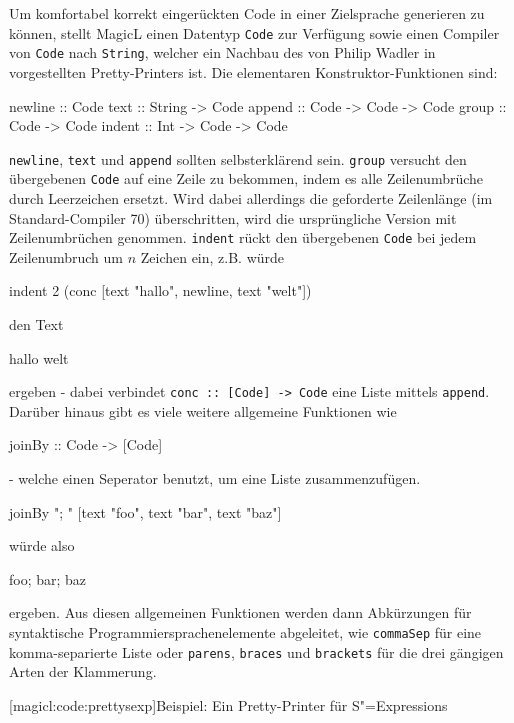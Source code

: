 \documentclass[11pt, a4paper, bibgerm]{book}
\newcommand\icode[1]{\lstinline?#1?}
\newcommand\lsubsection{}
\newcommand{\sexps}{S"=Expressions}
\begin{document}
Um komfortabel korrekt eingerückten Code in einer Zielsprache generieren
zu können, stellt MagicL einen Datentyp \icode{Code} zur Verfügung sowie
einen Compiler von \icode{Code} nach \icode{String}, welcher ein Nachbau
des von Philip Wadler in \cite[S.223ff]{FunOfProgramming} vorgestellten
Pretty-Printers ist. Die elementaren Konstruktor-Funktionen sind:
\begin{code}
newline :: Code
text    :: String -> Code
append  :: Code   -> Code -> Code
group   :: Code   -> Code
indent  :: Int    -> Code -> Code
\end{code}

\icode{newline}, \icode{text} und \icode{append} sollten selbsterklärend
sein. \icode{group} versucht den übergebenen \icode{Code} auf eine Zeile
zu bekommen, indem es alle Zeilenumbrüche durch Leerzeichen
ersetzt. Wird dabei allerdings die geforderte Zeilenlänge (im
Standard-Compiler 70) überschritten, wird die ursprüngliche Version mit
Zeilenumbrüchen genommen. \icode{indent} rückt den übergebenen
\icode{Code} bei jedem Zeilenumbruch um $n$ Zeichen ein, z.B. würde
\begin{code}
indent 2 (conc [text "hallo", newline, text "welt"])
\end{code}
den Text
\begin{code}
hallo
  welt
\end{code}
ergeben - dabei verbindet \icode{conc :: [Code] -> Code} eine Liste
mittels \icode{append}. Darüber hinaus gibt es viele weitere allgemeine
Funktionen wie
\begin{code}
  joinBy :: Code -> [Code]
\end{code}
- welche einen Seperator benutzt, um eine Liste zusammenzufügen.
\begin{code}
joinBy "; " [text "foo", text "bar", text "baz"]
\end{code}
würde also
\begin{code}
foo; bar; baz
\end{code}
ergeben. Aus diesen allgemeinen Funktionen werden dann Abkürzungen für
syntaktische Programmiersprachenelemente abgeleitet, wie
\icode{commaSep} für eine komma-separierte Liste oder \icode{parens},
\icode{braces} und \icode{brackets} für die drei gängigen Arten der
Klammerung.

\lsubsection[magicl:code:prettysexp]{Beispiel: Ein Pretty-Printer für \sexps{}}
\end{document}
